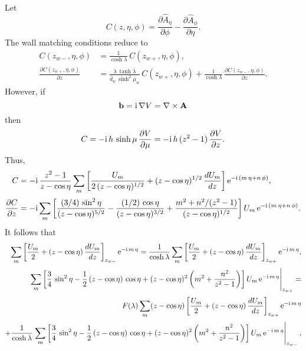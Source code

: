 \documentclass[12pt,prb,aps,notitlepage]{revtex4-1}
\begin{document}
Let
\begin{equation}
C(z,\eta,\phi) = \frac{\partial \hat{A}_\eta}{\partial \phi}- \frac{\partial \hat{A}_\phi}{\partial \eta}.
\end{equation}
The wall matching conditions reduce to 
\begin{align}
C(z_{w-},\eta,\phi) &= \frac{1}{\cosh\lambda}\,C(z_{w+},\eta,\phi),\\[0.5ex]
\frac{\partial C(z_{w+},\eta,\phi) }{\partial z}& = \frac{\lambda\,\tanh\lambda}{\bar{d}_w\,\sinh^2\mu_w}\,C(z_{w+},\eta,\phi) +\frac{1}{\cosh\lambda}\,\frac{\partial C(z_{w-},\eta,\phi) }{\partial z}.
\end{align}
However, if
\begin{equation}
{\bf b} = {\rm i}\,\nabla V =\nabla\times {\bf A}
\end{equation}
then
\begin{equation}
C = -{\rm i}\,h\,\sinh\mu\,\frac{\partial V}{\partial \mu} = -{\rm i}\,h\,(z^2-1)\,\frac{\partial V}{\partial z}.
\end{equation}
Thus,
\begin{align}
C &= -{\rm i}\,\frac{z^2-1}{z-\cos\eta}\sum_m\left[\frac{U_m}{2\,(z-\cos\eta)^{1/2}} + (z-\cos\eta)^{1/2}\,\frac{dU_m}{dz}\right]{\rm e}^{-{\rm i}\,(m\,\eta+n\,\phi)},\\[0.5ex]
\frac{\partial C}{\partial z} &= -{\rm i}\sum_m\left[\frac{(3/4)\,\sin^2\eta}{(z-\cos\eta)^{5/2}}-\frac{(1/2)\,\cos\eta}{(z-\cos\eta)^{3/2}}+ \frac{m^2+n^2/(z^2-1)}{(z-\cos\eta)^{1/2}}\right]
U_m\,{\rm e}^{-{\rm i}\,(m\,\eta+n\,\phi)}.
\end{align}
It follows that
\begin{align}
\sum_m\left[\frac{U_m}{2}+(z-\cos\eta)\,\frac{dU_m}{dz}\right]_{z_{w-}}{\rm e}^{-{\rm i}\,m\,\eta}= \frac{1}{\cosh\lambda}\sum_m\left[\frac{U_m}{2}+(z-\cos\eta)\,\frac{dU_m}{dz}\right]_{z_{w+}}{\rm e}^{-{\rm i}\,m\,\eta},\\[0.5ex]
\left.\sum_m\left[\frac{3}{4}\,\sin^2\eta-\frac{1}{2}\,(z-\cos\eta)\,\cos\eta+ (z-\cos\eta)^2\left(m^2+\frac{n^2}{z^2-1}\right)\right]
U_m\,{\rm e}^{-{\rm i}\,m\,\eta}\right|_{z_{w+}}=\nonumber\\[0.5ex]
F(\lambda) \sum_m(z-\cos\eta)\left[\frac{U_m}{2}+(z-\cos\eta)\,\frac{dU_m}{dz}\right]_{z_{w+}}{\rm e}^{-{\rm i}\,m\,\eta}\nonumber\\[0.5ex]
+\frac{1}{\cosh\lambda}\left.\sum_m\left[\frac{3}{4}\,\sin^2\eta-\frac{1}{2}\,(z-\cos\eta)\,\cos\eta+ (z-\cos\eta)^2\left(m^2+\frac{n^2}{z^2-1}\right)\right]
U_m\,{\rm e}^{-{\rm i}\,m\,\eta}\right|_{z_{w-}},
\end{align}
\end{document}

